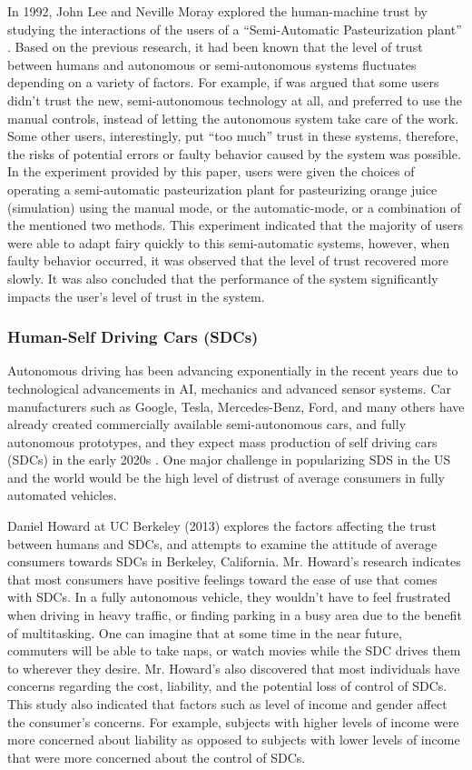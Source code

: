 \documentclass[runningheads,a4paper]{llncs}
\begin{document}
In 1992, John Lee and Neville Moray explored the human-machine trust by studying the interactions of the users of a ``Semi-Automatic Pasteurization plant'' \cite{lee1992trust}. Based on the previous research, it had been known that the level of trust between humans and autonomous or semi-autonomous systems fluctuates depending on a variety of factors. For example, if was argued that some users didn't trust the new, semi-autonomous technology at all, and preferred to use the manual controls, instead of letting the autonomous system take care of the work. Some other users, interestingly, put ``too much'' trust in these systems, therefore, the risks of potential errors or faulty behavior caused by the system was possible. In the experiment provided by this paper, users were given the choices of operating a semi-automatic pasteurization plant for pasteurizing orange juice (simulation) using the manual mode, or the automatic-mode, or a combination of the mentioned two methods. This experiment indicated that the majority of users were able to adapt fairy quickly to this semi-automatic systems, however, when faulty behavior occurred, it was observed that the level of trust recovered more slowly. It was also concluded that the performance of the system significantly impacts the user's level of trust in the system.



\subsubsection{Human-Self Driving Cars (SDCs)}
Autonomous driving has been advancing exponentially in the recent years due to technological advancements in AI, mechanics and advanced sensor systems. Car manufacturers such as Google, Tesla, Mercedes-Benz, Ford, and many others have already created commercially available semi-autonomous cars, and fully autonomous prototypes, and they expect mass production of self driving cars (SDCs) in the early 2020s \cite{driverlessFutureForcast}. One major challenge in popularizing SDS in the US and the world would be the high level of distrust of average consumers in fully automated vehicles.

Daniel Howard at UC Berkeley (2013) \cite{howard2014public} explores the factors affecting the trust between humans and SDCs, and attempts to examine the attitude of average consumers towards SDCs in Berkeley, California. Mr. Howard's research indicates that most consumers have positive feelings toward the ease of use that comes with SDCs. In a fully autonomous vehicle, they wouldn't have to feel frustrated when driving in heavy traffic, or finding parking in a busy area due to the benefit of multitasking. One can imagine that at some time in the near future, commuters will be able to take naps, or watch movies while the SDC drives them to wherever they desire. Mr. Howard's also discovered that most individuals have concerns regarding the cost, liability, and the potential loss of control of SDCs. This study also indicated that factors such as level of income and gender affect the consumer's concerns. For example, subjects with higher levels of income were more concerned about liability as opposed to subjects with lower levels of income that were more concerned about the control of SDCs.
\end{document}
